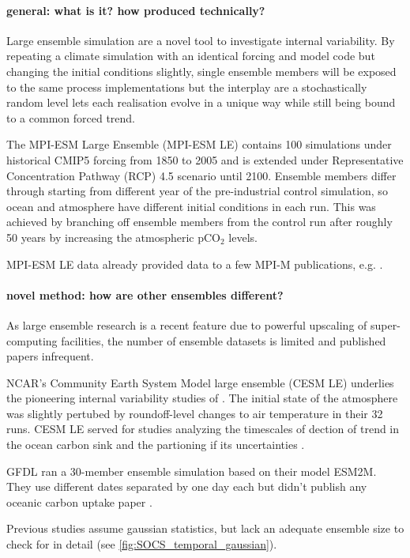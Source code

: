 \documentclass[12pt]{article}
\begin{document}
\paragraph{general: what is it? how produced technically?}
Large ensemble simulation are a novel tool to investigate internal variability. By repeating a climate simulation with an identical forcing and model code but changing the initial conditions slightly, single ensemble members will be exposed to the same process implementations but the interplay are a stochastically random level lets each realisation evolve in a unique way while still being bound to a common forced trend.
 
The MPI-ESM Large Ensemble (MPI-ESM LE) contains 100 simulations under historical CMIP5 forcing from 1850 to 2005 and is extended under Representative Concentration Pathway (RCP) 4.5 scenario until 2100. Ensemble members differ through starting from different year of the pre-industrial control simulation, so ocean and atmosphere have different initial conditions in each run. This was achieved by branching off ensemble members from the control run after roughly 50 years by increasing the atmospheric pCO$_2$ levels.

MPI-ESM LE data already provided data to a few MPI-M publications, e.g. \citep{Marotzke2015,Bittner2016}.

\paragraph{novel method: how are other ensembles different?} 
As large ensemble research is a recent feature due to powerful upscaling of super-computing facilities, the number of ensemble datasets is limited and published papers infrequent.

NCAR's Community Earth System Model large ensemble (CESM LE) \citep{Kay2015} underlies the pioneering internal variability studies of \citeauthor{Deser2012}. The initial state of the atmosphere  was slightly pertubed by roundoff-level changes to air temperature in their 32 runs. CESM LE served for studies analyzing the timescales of dection of trend in the ocean carbon sink \citep{McKinley2016} and the partioning if its uncertainties \citep{Lovenduski2016}.

GFDL ran a 30-member ensemble simulation based on their model ESM2M. They use different dates separated by one day each but didn't publish any oceanic carbon uptake paper \citep{Rodgers2015}.

Previous studies assume gaussian statistics, but lack an adequate ensemble size to check for in detail \citep{Thompson2015,Deser2012} (see \ref{fig:SOCS_temporal_gaussian}).
\end{document}
